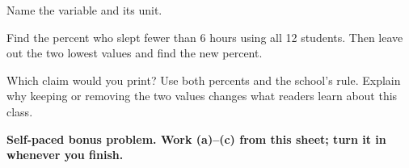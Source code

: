 \documentclass[14pt]{extarticle}
\begin{document}
\begin{description}[leftmargin=1.15in, labelwidth=1in, itemsep=2pt, topsep=2pt]
  \item[\dokbadge{1}~(a)] Name the variable and its unit.
  \item[\dokbadge{2}~(b)] Find the percent who slept fewer than 6 hours using all 12 students. Then leave out the two lowest values and find the new percent.
  \item[\dokbadge{3}~(c)] Which claim would you print? Use both percents and the school's rule. Explain why keeping or removing the two values changes what readers learn about this class.
\end{description}

\vfill
\textbf{Self-paced bonus problem. Work (a)--(c) from this sheet; turn it in whenever you finish.}
\end{document}
